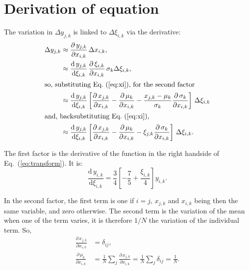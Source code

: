 \documentclass[twocolumn]{article}
\def\der#1#2{\frac{\mathrm{d}\,{#1}}{\mathrm{d}#2}}
\def\pder#1#2{\frac{\partial\,{#1}}{\partial#2}}
\def\eqref#1{Eq.~(\ref{eq:#1})}
\begin{document}
\section{Derivation of equation}
\label{sec:calculus}
The variation in $\Delta y_{j,k}$ is linked to $\Delta \xi_{i,k}$ via the
derivative:
\begin{align}
    \Delta y_{j,k} 
        &\approx \pder{y_{j,k}}{x_{i,k}}
                 \, \Delta x_{i,k},\\
        &\approx \der{y_{j,k}}{\xi_{i,k}}
                 \, \pder{\xi_{i,k}}{x_{i,k}}
                 \, \sigma_k \Delta \xi_{i,k},\\
\intertext{so, substituting \eqref{xi}, for the second factor}
        &\approx \der{y_{j,k}}{\xi_{i,k}}
                 \left[
                    \pder{x_{j,k}}{x_{i,k}}
                  - \pder{\mu_k}{x_{i,k}} 
                  - \frac{x_{j,k}-\mu_k}{\sigma_k}\pder{\sigma_k}{x_{i,k}} 
                 \right] 
                 \, \Delta \xi_{i,k}\\
\intertext{and, backsubstituting \eqref{xi},}
        &\approx \der{y_{j,k}}{\xi_{i,k}}
                 \left[
                    \pder{x_{j,k}}{x_{i,k}}
                  - \pder{\mu_k}{x_{i,k}}
                  - \xi_{j,k} \pder{\sigma_k}{x_{i,k}}
                 \right]
                 \, \Delta \xi_{i,k}.
\end{align}

The first factor is the derivative of the function in the right handside of Eq.~(\ref{eq:transform}). It is:
\begin{equation}
    \der{y_{i,k}}{\xi_{i,k}} = \frac34 \left[ -\frac75 + \frac{\xi_{i,k}}4 \right] y_{i,k}.
\end{equation}

In the second factor, the first term is one if $i = j$, $x_{j,k}$ and $x_{i,k}$ being then the same variable, and zero otherwise.  The second term is the variation of the mean when one of the term varies, it is therefore $1/N$ the variation of the individual term. So,
\begin{align}
    \pder{x_{j,k}}{x_{i,k}} &= \delta_{ij}, \label{eq:derx}\\
    \pder{\mu_k}{x_{i,k}}   &= \frac 1N \sum_j \pder{x_{j,k}}{x_{i,k}}
                             = \frac 1N \sum_j \delta_{ij}
                             = \frac 1N. \label{eq:dermu}
\end{align}
\end{document}
